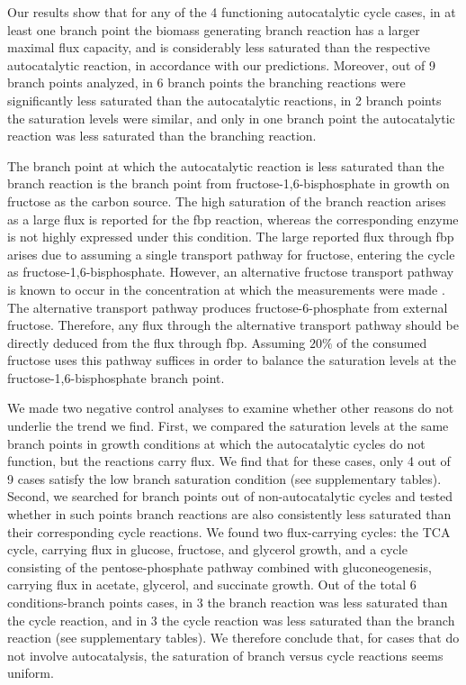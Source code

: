     Our results show that for any of the 4 functioning autocatalytic cycle cases, in at least one branch point the biomass generating branch reaction has a larger maximal flux capacity, and is considerably less saturated than the respective autocatalytic reaction, in accordance with our predictions.
    Moreover, out of 9 branch points analyzed, in 6 branch points the branching reactions were significantly less saturated than the autocatalytic reactions, in 2 branch points the saturation levels were similar, and only in one branch point the autocatalytic reaction was less saturated than the branching reaction.

    The branch point at which the autocatalytic reaction is less saturated than the branch reaction is the branch point from fructose-1,6-bisphosphate in growth on fructose as the carbon source.
    The high saturation of the branch reaction arises as a large flux is reported for the fbp reaction, whereas the corresponding enzyme is not highly expressed under this condition.
    The large reported flux through fbp arises due to assuming a single transport pathway for fructose, entering the cycle as fructose-1,6-bisphosphate.
    However, an alternative fructose transport pathway is known to occur in the concentration at which the measurements were made \cite{Kornberg1990-ft}.
    The alternative transport pathway produces fructose-6-phosphate from external fructose.
    Therefore, any flux through the alternative transport pathway should be directly deduced from the flux through fbp.
    Assuming $20\%$ of the consumed fructose uses this pathway suffices in order to balance the saturation levels at the fructose-1,6-bisphosphate branch point.

    We made two negative control analyses to examine whether other reasons do not underlie the trend we find.
    First, we compared the saturation levels at the same branch points in growth conditions at which the autocatalytic cycles do not function, but the reactions carry flux.
    We find that for these cases, only 4 out of 9 cases satisfy the low branch saturation condition (see supplementary tables).
    Second, we searched for branch points out of non-autocatalytic cycles and tested whether in such points branch reactions are also consistently less saturated than their corresponding cycle reactions.
    We found two flux-carrying cycles: the TCA cycle, carrying flux in glucose, fructose, and glycerol growth, and a cycle consisting of the pentose-phosphate pathway combined with gluconeogenesis, carrying flux in acetate, glycerol, and succinate growth.
    Out of the total 6 conditions-branch points cases, in 3 the branch reaction was less saturated than the cycle reaction, and in 3 the cycle reaction was less saturated than the branch reaction (see supplementary tables).
    We therefore conclude that, for cases that do not involve autocatalysis, the saturation of branch versus cycle reactions seems uniform.
    

